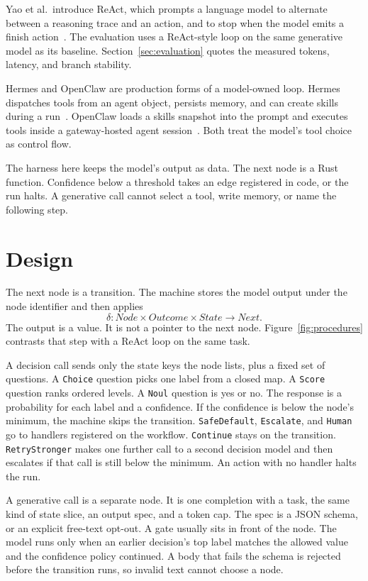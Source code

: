 \documentclass[11pt]{article}
\begin{document}
Yao et al.\ introduce ReAct, which prompts a language model to alternate
between a reasoning trace and an action, and to stop when the model emits a
finish action~\cite{yao2023react}. The evaluation uses a ReAct-style loop on
the same generative model as its baseline.
Section~\ref{sec:evaluation} quotes the measured tokens, latency, and branch
stability.

Hermes and OpenClaw are production forms of a model-owned loop. Hermes
dispatches tools from an agent object, persists memory, and can create skills
during a run~\cite{hermes-loop}. OpenClaw loads a skills snapshot into the
prompt and executes tools inside a gateway-hosted agent
session~\cite{openclaw-loop}. Both treat the model's tool choice as control
flow.

The harness here keeps the model's output as data. The next node is a Rust
function. Confidence below a threshold takes an edge registered in code, or
the run halts. A generative call cannot select a tool, write memory, or name
the following step.

\section{Design}
\label{sec:design}

The next node is a transition. The machine stores the model output under the
node identifier and then applies
\begin{equation}
\delta : \mathit{Node} \times \mathit{Outcome} \times \mathit{State} \rightarrow \mathit{Next}.
\label{eq:delta}
\end{equation}
The output is a value. It is not a pointer to the next node.
Figure~\ref{fig:procedures} contrasts that step with a ReAct loop on the same
task.

A decision call sends only the state keys the node lists, plus a fixed set of
questions. A \texttt{Choice} question picks one label from a closed map. A
\texttt{Score} question ranks ordered levels. A \texttt{Noul} question is yes
or no. The response is a probability for each label and a confidence. If the
confidence is below the node's minimum, the machine skips the transition.
\texttt{SafeDefault}, \texttt{Escalate}, and \texttt{Human} go to handlers
registered on the workflow. \texttt{Continue} stays on the transition.
\texttt{RetryStronger} makes one further call to a second decision model and
then escalates if that call is still below the minimum. An action with no
handler halts the run.

A generative call is a separate node. It is one completion with a task, the
same kind of state slice, an output spec, and a token cap. The spec is a JSON
schema, or an explicit free-text opt-out. A gate usually sits in front of the
node. The model runs only when an earlier decision's top label matches the
allowed value and the confidence policy continued. A body that fails the
schema is rejected before the transition runs, so invalid text cannot choose
a node.
\end{document}
